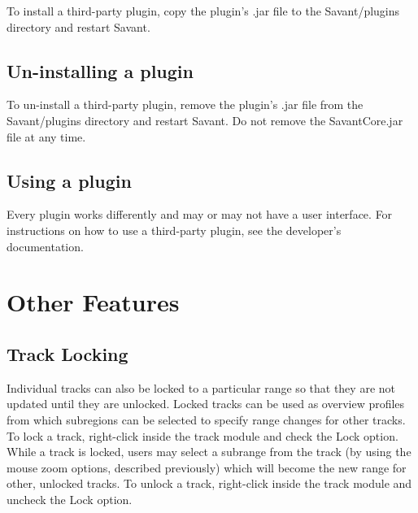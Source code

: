 \documentclass{report}
\begin{document}
To install a third-party plugin, copy the plugin's .jar file to the Savant/plugins directory and restart Savant.

\section{Un-installing a plugin}

To un-install a third-party plugin, remove the plugin's .jar file from the Savant/plugins directory and restart Savant. Do not remove the SavantCore.jar file at any time.

\section{Using a plugin}

Every plugin works differently and may or may not have a user interface. For instructions on how to use a third-party plugin, see the developer's documentation.

\chapter{Other Features}

\section{Track Locking}

Individual tracks can also be locked to a particular range so that they are not updated until they are unlocked. Locked tracks can be used as overview profiles from which subregions can be selected to specify range changes for other tracks. To lock a track, right-click inside the track module and check the Lock option. While a track is locked, users may select a subrange from the track (by using the mouse zoom options, described previously) which will become the new range for other, unlocked tracks. To unlock a track, right-click inside the track module and uncheck the Lock option.
\end{document}
